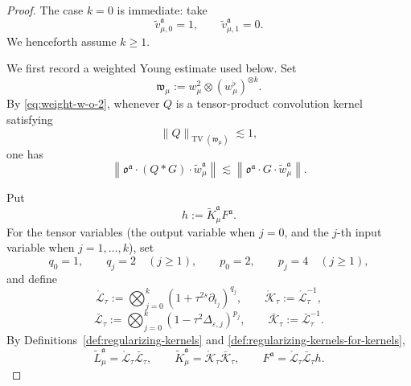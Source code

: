 \documentclass{article}
\numberwithin{equation}{section}
\newcommand{\assign}{:=}
\theoremstyle{plain}
\theoremstyle{definition}
\begin{document}
\begin{proof}
	The case $k=0$ is immediate: take
	\[
	\tilde v_{\mu,0}^{\mathfrak a}=1,
	\qquad
	\tilde v_{\mu,1}^{\mathfrak a}=0.
	\]
	We henceforth assume $k\geqslant1$.
	
	We first record a weighted Young estimate used below. Set
	\[
	\mathfrak w_\mu
	\assign
	w_\mu^2\otimes(w_\mu^\flat)^{\otimes k}.
	\]
	By \eqref{eq:weight-w-o-2}, whenever $Q$ is a tensor-product convolution
	kernel satisfying
	\[
	\|Q\|_{\operatorname{TV}(\mathfrak w_\mu)}\lesssim1,
	\]
	one has
	\begin{equation}
		\label{eq:aux-weight-combined-young}
		\left\|
		\mathfrak o^{\mathfrak a}\cdot(Q*G)\cdot
		\tilde w_\mu^{\mathfrak a}
		\right\|
		\lesssim
		\left\|
		\mathfrak o^{\mathfrak a}\cdot G\cdot
		\tilde w_\mu^{\mathfrak a}
		\right\|.
	\end{equation}
	
	Put
	\[
	h\assign\tilde K_\mu^{\mathfrak a}F^{\mathfrak a}.
	\]
	For the tensor variables (the output variable when $j=0$, and the
	$j$-th input variable when $j=1,\ldots,k$), set
	\[
	q_0=1,
	\qquad q_j=2\quad(j\geqslant1),
	\qquad
	p_0=2,
	\qquad p_j=4\quad(j\geqslant1),
	\]
	and define
	\[
	\mathring{\mathcal L}_\tau
	\assign
	\bigotimes_{j=0}^k
	(1+\tau^{2s}\partial_{t_j})^{q_j},
	\qquad
	\mathring{\mathcal K}_\tau
	\assign\mathring{\mathcal L}_\tau^{-1},
	\]
	\[
	\bar{\mathcal L}_\tau
	\assign
	\bigotimes_{j=0}^k
	(1-\tau^2\Delta_{\varepsilon,j})^{p_j},
	\qquad
	\bar{\mathcal K}_\tau
	\assign\bar{\mathcal L}_\tau^{-1}.
	\]
	By Definitions~\ref{def:regularizing-kernels} and
	\ref{def:regularizing-kernels-for-kernels},
	\begin{equation}
		\label{eq:aux-weight-combined-factorisation}
		\tilde L_\mu^{\mathfrak a}
		=\mathring{\mathcal L}_\tau\bar{\mathcal L}_\tau,
		\qquad
		\tilde K_\mu^{\mathfrak a}
		=\mathring{\mathcal K}_\tau\bar{\mathcal K}_\tau,
		\qquad
		F^{\mathfrak a}
		=\mathring{\mathcal L}_\tau\bar{\mathcal L}_\tau h.
	\end{equation}
	

\end{proof}
\end{document}

